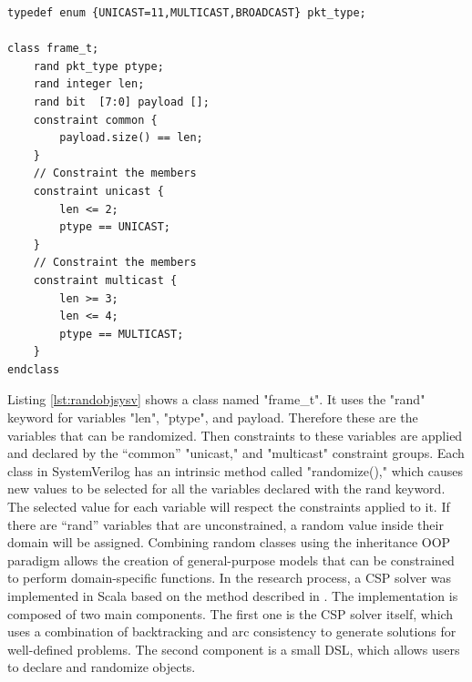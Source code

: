 \documentclass[conference]{IEEEtran}
\begin{document}
\begin{lstlisting}[caption={Random object in SystemVerilog}, label={lst:randobjsysv}]
typedef enum {UNICAST=11,MULTICAST,BROADCAST} pkt_type;

class frame_t;
    rand pkt_type ptype;
    rand integer len;
    rand bit  [7:0] payload [];
    constraint common {
        payload.size() == len;
    }
    // Constraint the members
    constraint unicast {
        len <= 2;
        ptype == UNICAST;
    }
    // Constraint the members
    constraint multicast {
        len >= 3;
        len <= 4;
        ptype == MULTICAST;
    }
endclass
\end{lstlisting}
Listing \ref{lst:randobjsysv} shows a class named "frame\_t". It uses the "rand" keyword for variables "len", "ptype", and payload.
Therefore these are the variables that can be randomized. Then constraints to these variables are applied and declared by the ``common'' "unicast,"
and "multicast" constraint groups. Each class in SystemVerilog has an intrinsic method called "randomize()," which causes new values to be selected
for all the variables declared with the rand keyword. The selected value for each variable will respect the constraints applied to it. If there are
``rand'' variables that are unconstrained, a random value inside their domain will be assigned. Combining random classes using the inheritance OOP
paradigm allows the creation of general-purpose models that can be constrained to perform domain-specific functions. In the research process, a
CSP solver was implemented in Scala based on the method described in \cite{wolf2006object}. The implementation is composed of two main components.
The first one is the CSP solver itself, which uses a combination of backtracking and arc consistency to generate solutions for well-defined problems.
The second component is a small DSL, which allows users to declare and randomize objects.
\end{document}
